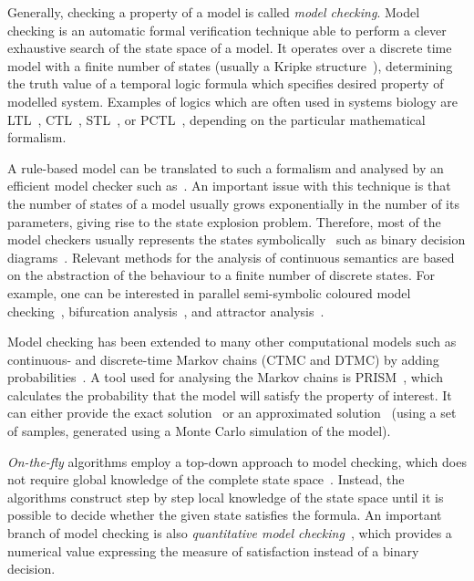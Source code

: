 \documentclass[11pt,a4paper]{report}
\begin{document}
Generally, checking a property of a model is called \emph{model checking}. Model checking is an automatic formal verification technique able to perform a clever exhaustive search of the state space of a model. It operates over a discrete time model with a finite number of states (usually a Kripke structure~\cite{kripke1963semantical}), determining the truth value of a temporal logic formula which specifies desired property of modelled system. Examples of logics which are often used in systems biology are LTL~\cite{pnueli1977temporal}, CTL~\cite{clarke1986automatic}, STL~\cite{maler2004monitoring}, or PCTL~\cite{hasson1994logic}, depending on the particular mathematical formalism.

A rule-based model can be translated to such a formalism and analysed by an efficient model checker such as~\cite{cimatti2002nusmv}. An important issue with this technique is that the number of states of a model usually grows exponentially in the number of its parameters, giving rise to the state explosion problem. Therefore, most of the model checkers usually represents the states symbolically~\cite{burch1992symbolic} such as binary decision diagrams~\cite{bryant2001graph}. Relevant methods for the analysis of continuous semantics are based on the abstraction of the behaviour to a finite number of discrete states. For example, one can be interested in parallel semi-symbolic coloured model checking~\cite{benevs2016model}, bifurcation analysis~\cite{benevs2017discrete}, and attractor analysis~\cite{benevs2018fully}.

Model checking has been extended to many other computational models such as continuous- and discrete-time Markov chains (CTMC and DTMC) by adding probabilities~\cite{kwiatkowska2010probabilistic}. A tool used for analysing the Markov chains is PRISM~\cite{kwiatkowska2011prism}, which calculates the probability that the model will satisfy the property of interest. It can either provide the exact solution~\cite{aziz2000model} or an approximated solution~\cite{jha2009bayesian} (using a set of samples, generated using a Monte Carlo simulation of the model). 

\emph{On-the-fly} algorithms employ a top-down approach to model checking, which does not require global knowledge of the complete state space~\cite{latella2014fly,bhat1995efficient,courcoubetis1992memory,gnesi2011abstract,holzmann2004spin}. Instead, the algorithms construct step by step local knowledge of the state space until it is possible to decide whether the given state satisfies the formula. An important branch of model checking is also \emph{quantitative model checking}~\cite{huth1997quantitative}, which provides a numerical value expressing the measure of satisfaction instead of a binary decision.
\end{document}
